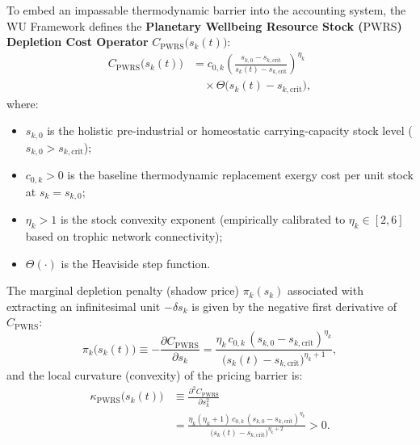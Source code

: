 \documentclass[aps,pre,twocolumn,10pt,superscriptaddress,amsmath,amssymb,amsfonts,floatfix,showkeys]{revtex4-2}
\begin{document}
To embed an impassable thermodynamic barrier into the accounting system, the WU Framework defines the \textbf{Planetary Wellbeing Resource Stock ($\text{PWRS}$) Depletion Cost Operator} $C_{\text{PWRS}}\big(s_k(t)\big)$:
\begin{equation}
\begin{aligned}
    C_{\text{PWRS}}\big(s_k(t)\big) &= c_{0,k} \left( \frac{s_{k,0} - s_{k,\text{crit}}}{s_k(t) - s_{k,\text{crit}}} \right)^{\eta_k} \\
    &\quad \times \Theta\big(s_k(t) - s_{k,\text{crit}}\big),
\end{aligned}
\label{eq:pwrs_operator}
\end{equation}
where:
\begin{itemize}
    \item $s_{k,0}$ is the holistic pre-industrial or homeostatic carrying-capacity stock level ($s_{k,0} > s_{k,\text{crit}}$);
    \item $c_{0,k} > 0$ is the baseline thermodynamic replacement exergy cost per unit stock at $s_k = s_{k,0}$;
    \item $\eta_k > 1$ is the stock convexity exponent (empirically calibrated to $\eta_k \in [2, 6]$ based on trophic network connectivity);
    \item $\Theta(\cdot)$ is the Heaviside step function.
\end{itemize}

The marginal depletion penalty (shadow price) $\pi_k(s_k)$ associated with extracting an infinitesimal unit $-\delta s_k$ is given by the negative first derivative of $C_{\text{PWRS}}$:
\begin{equation}
    \pi_k\big(s_k(t)\big) \equiv -\frac{\partial C_{\text{PWRS}}}{\partial s_k} = \frac{\eta_k \, c_{0,k} \, (s_{k,0} - s_{k,\text{crit}})^{\eta_k}}{\big(s_k(t) - s_{k,\text{crit}}\big)^{\eta_k + 1}},
    \label{eq:marginal_penalty}
\end{equation}
and the local curvature (convexity) of the pricing barrier is:
\begin{equation}
\begin{aligned}
    \kappa_{\text{PWRS}}\big(s_k(t)\big) &\equiv \frac{\partial^2 C_{\text{PWRS}}}{\partial s_k^2} \\
    &= \frac{\eta_k (\eta_k + 1) \, c_{0,k} \, (s_{k,0} - s_{k,\text{crit}})^{\eta_k}}{\big(s_k(t) - s_{k,\text{crit}}\big)^{\eta_k + 2}} > 0.
\end{aligned}
\label{eq:pwrs_curvature}
\end{equation}
\end{document}
